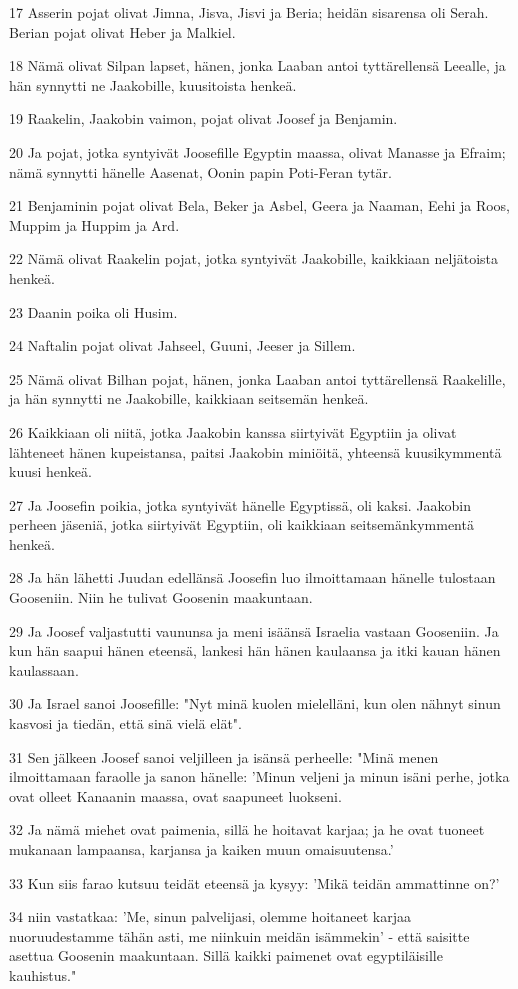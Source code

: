 \par 17 Asserin pojat olivat Jimna, Jisva, Jisvi ja Beria; heidän sisarensa oli Serah. Berian pojat olivat Heber ja Malkiel.
\par 18 Nämä olivat Silpan lapset, hänen, jonka Laaban antoi tyttärellensä Leealle, ja hän synnytti ne Jaakobille, kuusitoista henkeä.
\par 19 Raakelin, Jaakobin vaimon, pojat olivat Joosef ja Benjamin.
\par 20 Ja pojat, jotka syntyivät Joosefille Egyptin maassa, olivat Manasse ja Efraim; nämä synnytti hänelle Aasenat, Oonin papin Poti-Feran tytär.
\par 21 Benjaminin pojat olivat Bela, Beker ja Asbel, Geera ja Naaman, Eehi ja Roos, Muppim ja Huppim ja Ard.
\par 22 Nämä olivat Raakelin pojat, jotka syntyivät Jaakobille, kaikkiaan neljätoista henkeä.
\par 23 Daanin poika oli Husim.
\par 24 Naftalin pojat olivat Jahseel, Guuni, Jeeser ja Sillem.
\par 25 Nämä olivat Bilhan pojat, hänen, jonka Laaban antoi tyttärellensä Raakelille, ja hän synnytti ne Jaakobille, kaikkiaan seitsemän henkeä.
\par 26 Kaikkiaan oli niitä, jotka Jaakobin kanssa siirtyivät Egyptiin ja olivat lähteneet hänen kupeistansa, paitsi Jaakobin miniöitä, yhteensä kuusikymmentä kuusi henkeä.
\par 27 Ja Joosefin poikia, jotka syntyivät hänelle Egyptissä, oli kaksi. Jaakobin perheen jäseniä, jotka siirtyivät Egyptiin, oli kaikkiaan seitsemänkymmentä henkeä.
\par 28 Ja hän lähetti Juudan edellänsä Joosefin luo ilmoittamaan hänelle tulostaan Gooseniin. Niin he tulivat Goosenin maakuntaan.
\par 29 Ja Joosef valjastutti vaununsa ja meni isäänsä Israelia vastaan Gooseniin. Ja kun hän saapui hänen eteensä, lankesi hän hänen kaulaansa ja itki kauan hänen kaulassaan.
\par 30 Ja Israel sanoi Joosefille: "Nyt minä kuolen mielelläni, kun olen nähnyt sinun kasvosi ja tiedän, että sinä vielä elät".
\par 31 Sen jälkeen Joosef sanoi veljilleen ja isänsä perheelle: "Minä menen ilmoittamaan faraolle ja sanon hänelle: 'Minun veljeni ja minun isäni perhe, jotka ovat olleet Kanaanin maassa, ovat saapuneet luokseni.
\par 32 Ja nämä miehet ovat paimenia, sillä he hoitavat karjaa; ja he ovat tuoneet mukanaan lampaansa, karjansa ja kaiken muun omaisuutensa.'
\par 33 Kun siis farao kutsuu teidät eteensä ja kysyy: 'Mikä teidän ammattinne on?'
\par 34 niin vastatkaa: 'Me, sinun palvelijasi, olemme hoitaneet karjaa nuoruudestamme tähän asti, me niinkuin meidän isämmekin' - että saisitte asettua Goosenin maakuntaan. Sillä kaikki paimenet ovat egyptiläisille kauhistus."

